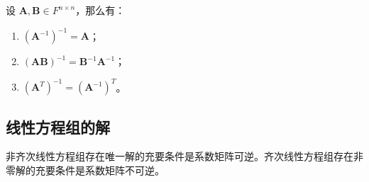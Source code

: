 \begin{proposition}[矩阵逆的性质]
    设 $\mathbf{A},\mathbf{B} \in F^{n \times n}$，那么有：
    \begin{enumerate}
        \item $(\mathbf{A}^{-1})^{-1} = \mathbf{A}$；
        \item $(\mathbf{A}\mathbf{B})^{-1} = \mathbf{B}^{-1}\mathbf{A}^{-1}$；
        \item $(\mathbf{A}^T)^{-1} = (\mathbf{A}^{-1})^T$。
    \end{enumerate}
\end{proposition}

\vspace{1em}

\subsection{线性方程组的解}

\begin{proposition}
    非齐次线性方程组存在唯一解的充要条件是系数矩阵可逆。齐次线性方程组存在非零解的充要条件是系数矩阵不可逆。
    \label{prop:linear_equations_solutions}
\end{proposition}

